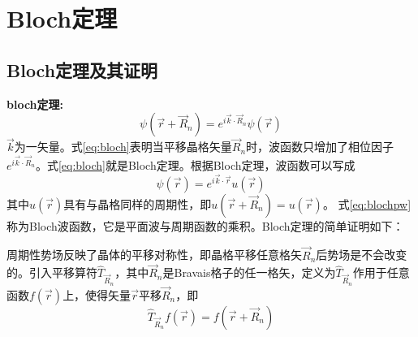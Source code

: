 


\section{Bloch定理}
\subsection{Bloch定理及其证明}
{\bf bloch定理:}\hspace{1\ccwd}{\it 对于具有周期性的势场，单电子的Schr\"odinger方程为}
\begin{equation}
  \psi(\vec r+\vec R_n)=e^{i\vec k\cdot\vec R_n}\psi(\vec r)
  \label{eq:bloch}
\end{equation}
{$\vec k$为一矢量}。式\eqref{eq:bloch}表明当平移晶格矢量$\vec R_n$时，波函数只增加了相位因子$e^{i\vec k\cdot\vec R_n}$。式\eqref{eq:bloch}就是Bloch定理\cite{ZP52-555_1928}。根据Bloch定理，波函数可以写成
\begin{equation}
  \psi(\vec r)=e^{i\vec k\cdot\vec r}u(\vec r)
  \label{eq:blochpw}
\end{equation}
其中$u(\vec r)$具有与晶格同样的周期性，即$u(\vec r+\vec R_n)=u(\vec r)$。
式\eqref{eq:blochpw}称为Bloch波函数，它是平面波与周期函数的乘积。Bloch定理的简单证明如下：


周期性势场反映了晶体的平移对称性，即晶格平移任意格矢$\vec R_n$后势场是不会改变的。引入平移算符$\hat T_{\vec R_n}$，其中$\vec R_n$是Bravais格子的任一格矢，定义为$\hat T_{\vec R_n}$作用于任意函数$f(\vec r)$上，使得矢量$\vec r$平移$\vec R_n$，即
\begin{equation}
  \hat T_{\vec R_n}f(\vec r)=f(\vec r+\vec R_n)
  \label{eq:solid-17}
\end{equation}


